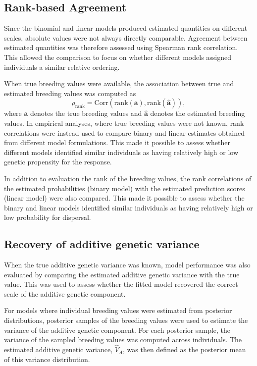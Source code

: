 \subsection{Rank-based Agreement}

Since the binomial and linear models produced estimated quantities on different scales, absolute values were not always directly comparable. Agreement between estimated quantities was therefore assessed using Spearman rank correlation. This allowed the comparison to focus on whether different models assigned individuals a similar relative ordering.

When true breeding values were available, the association between true and estimated breeding values was computed as
%
\[
\rho_{\mathrm{rank}} =
\mathrm{Corr}\left(
\mathrm{rank}(\mathbf{a}),
\mathrm{rank}(\hat{\mathbf{a}})
\right) ,
\]
%
where $\mathbf{a}$ denotes the true breeding values and $\hat{\mathbf{a}}$ denotes the estimated breeding values. In empirical analyses, where true breeding values were not known, rank correlations were instead used to compare binary and linear estimates obtained from different model formulations. This made it possible to assess whether different models identified similar individuals as having relatively high or low genetic propensity for the response.

In addition to evaluation the rank of the breeding values, the rank correlations of the estimated probabilities (binary model) with the estimated prediction scores (linear model) were also compared. This made it possible to assess whether the binary and linear models identified similar individuals as having relatively high or low probability for dispersal. 

\subsection{Recovery of additive genetic variance}

When the true additive genetic variance was known, model performance was also evaluated by comparing the estimated additive genetic variance with the true value. This was used to assess whether the fitted model recovered the correct scale of the additive genetic component.

For models where individual breeding values were estimated from posterior distributions, posterior samples of the breeding values were used to estimate the variance of the additive genetic component. For each posterior sample, the variance of the sampled breeding values was computed across individuals. The estimated additive genetic variance, $\hat{V}_A$, was then defined as the posterior mean of this variance distribution.


